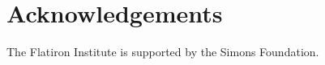 \documentclass[a4paper,fleqn,usenatbib]{mnras}
\begin{document}

\section*{Acknowledgements}

The Flatiron Institute is supported by the Simons Foundation.


%



\bsp	%
\label{lastpage}
\end{document}
